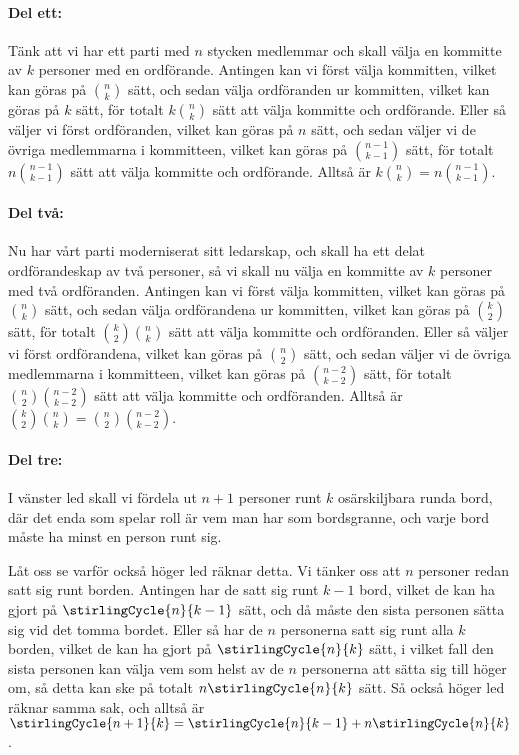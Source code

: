 \documentclass[nobib]{tufte-handout}
\begin{document}
\paragraph*{Del ett:} Tänk att vi har ett parti med $n$ stycken medlemmar och skall välja en kommitte av $k$ personer med en ordförande. Antingen kan vi först välja kommitten, vilket kan göras på $\binom{n}{k}$ sätt, och sedan välja ordföranden ur kommitten, vilket kan göras på $k$ sätt, för totalt $k\binom{n}{k}$ sätt att välja kommitte och ordförande. Eller så väljer vi först ordföranden, vilket kan göras på $n$ sätt, och sedan väljer vi de övriga medlemmarna i kommitteen, vilket kan göras på $\binom{n-1}{k-1}$ sätt, för totalt $n\binom{n-1}{k-1}$ sätt att välja kommitte och ordförande. Alltså är $k\binom{n}{k} = n\binom{n-1}{k-1}$.

\paragraph*{Del två:} Nu har vårt parti moderniserat sitt ledarskap, och skall ha ett delat ordförandeskap av två personer, så vi skall nu välja en kommitte av $k$ personer med två ordföranden. Antingen kan vi först välja kommitten, vilket kan göras på $\binom{n}{k}$ sätt, och sedan välja ordförandena ur kommitten, vilket kan göras på $\binom{k}{2}$ sätt, för totalt $\binom{k}{2}\binom{n}{k}$ sätt att välja kommitte och ordföranden. Eller så väljer vi först ordförandena, vilket kan göras på $\binom{n}{2}$ sätt, och sedan väljer vi de övriga medlemmarna i kommitteen, vilket kan göras på $\binom{n-2}{k-2}$ sätt, för totalt $\binom{n}{2}\binom{n-2}{k-2}$ sätt att välja kommitte och ordföranden. Alltså är $\binom{k}{2}\binom{n}{k} = \binom{n}{2}\binom{n-2}{k-2}$.

\paragraph*{Del tre:} I vänster led skall vi fördela ut $n+1$ personer runt $k$ osärskiljbara runda bord, där det enda som spelar roll är vem man har som bordsgranne, och varje bord måste ha minst en person runt sig.

Låt oss se varför också höger led räknar detta. Vi tänker oss att $n$ personer redan satt sig runt borden. Antingen har de satt sig runt $k-1$ bord, vilket de kan ha gjort på $\stirlingCycle{n}{k-1}$ sätt, och då måste den sista personen sätta sig vid det tomma bordet. Eller så har de $n$ personerna satt sig runt alla $k$ borden, vilket de kan ha gjort på $\stirlingCycle{n}{k}$ sätt, i vilket fall den sista personen kan välja vem som helst av de $n$ personerna att sätta sig till höger om, så detta kan ske på totalt $n\stirlingCycle{n}{k}$ sätt. Så också höger led räknar samma sak, och alltså är $\stirlingCycle{n+1}{k} = \stirlingCycle{n}{k-1} + n\stirlingCycle{n}{k}$.
\end{document}

